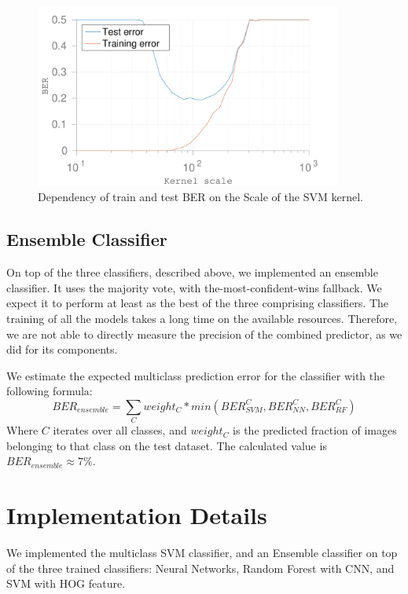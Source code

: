 \documentclass{article} %
\begin{document}
\begin{figure}[!t]
  \centering
  \includegraphics[width=0.9\textwidth]{figures/kernel_scale_ber.pdf}
  \caption{Dependency of train and test BER on the Scale of the SVM kernel.}
  \label{fig:SVMKernelScaleBER}
\end{figure}

\subsection{Ensemble Classifier}

On top of the three classifiers, described above, we implemented an ensemble classifier. It uses the majority vote, with the-most-confident-wins fallback. We expect it to perform at least as the best of the three comprising classifiers. The training of all the models takes a long time on the available resources. Therefore, we are not able to directly measure the precision of the combined predictor, as we did for its components.

We estimate the expected multiclass prediction error for the classifier with the following formula:
\[
BER_{ensemble} = \sum_C weight_C*min(BER_{SVM}^C, BER_{NN}^C, BER_{RF}^C)
\]
Where $C$ iterates over all classes, and $weight_C$ is the predicted fraction of images belonging to that class on the test dataset. The calculated value is $BER_{ensemble} \approx 7\%$.

\section{Implementation Details}

We implemented the multiclass SVM classifier, and an Ensemble classifier on top of the three trained classifiers: Neural Networks, Random Forest with CNN, and SVM with HOG feature.
\end{document}
